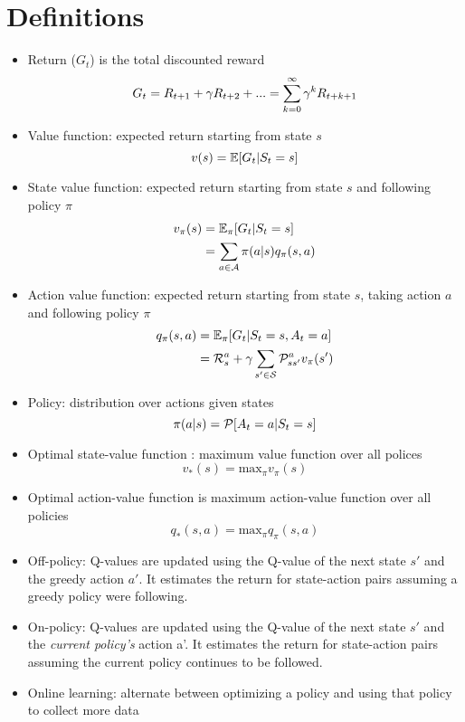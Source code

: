 \documentclass[../main.tex]{subfiles}
\begin{document}
\section{Definitions}
\begin{itemize}
  \item Return ($G_{t}$) is the total discounted reward
  \begin{equation*}
    G_{t} = R_{t+1} + \gamma R_{t+2} + ... = \sum_{k=0}^{\infty}\gamma^{k}R_{t+k+1}
  \end{equation*}
  \item Value function: expected return starting from state $s$
  \begin{equation*}
    v(s) = \mathbb{E}[G_{t}|S_{t} = s]
  \end{equation*}
  \item State value function: expected return starting from state $s$ and following policy $\pi$
  \begin{align*}
    v_{\pi}(s) &= \mathbb{E_{\pi}}[G_{t}|S_{t} = s] \\
               &= \sum_{a \in \mathcal{A}} \pi(a|s) q_{\pi}(s,a)
  \end{align*}
  \item Action value function: expected return starting from state $s$, taking action $a$ and following policy $\pi$
  \begin{align*}
    q_{\pi}(s,a) &= \mathbb{E_{\pi}}[G_{t}|S_{t} = s, A_{t} = a] \\
    &= \mathcal{R}_{s}^{a} + \gamma \sum_{s' \in \mathcal{S}} \mathcal{P}_{ss'}^{a} v_{\pi}(s')
  \end{align*}
  \item Policy: distribution over actions given states
  \begin{equation*}
    \pi(a|s) = \mathcal{P}[A_{t} = a | S_{t} = s]
  \end{equation*}
  \item Optimal state-value function : maximum value function over all polices
  \begin{equation*}
    v_{*}(s) = \text{max}_{\pi} v_{\pi}(s)
  \end{equation*}
  \item Optimal action-value function is maximum action-value function over all policies
  \begin{equation*}
    q_{*}(s,a) = \text{max}_{\pi} q_{\pi}(s,a)
  \end{equation*}
  \item Off-policy: Q-values are updated using the Q-value of the next state $s'$ and the greedy action $a'$. It estimates the return for state-action pairs assuming a greedy policy were following.
  \item On-policy: Q-values are updated using the Q-value of the next state $s'$ and the \textit{current policy's} action a'. It estimates the return for state-action pairs assuming the current policy continues to be followed.
  \item Online learning: alternate between optimizing a policy and using that policy to collect more data
\end{itemize}
\end{document}
